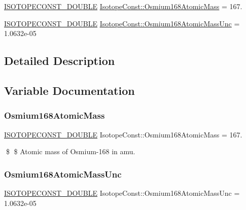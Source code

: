 \begin{DoxyCompactItemize}
\item 
\mbox{\hyperlink{group___isotope_const-_macros_ga8f45a7272ce02c0b4c65c44636ed719a}{I\+S\+O\+T\+O\+P\+E\+C\+O\+N\+S\+T\+\_\+\+D\+O\+U\+B\+LE}} \mbox{\hyperlink{group___isotope_const-_osmium-_os168_ga7a6e92fca4870475523eef9ddea7dcc1}{Isotope\+Const\+::\+Osmium168\+Atomic\+Mass}} = 167.
\item 
\mbox{\hyperlink{group___isotope_const-_macros_ga8f45a7272ce02c0b4c65c44636ed719a}{I\+S\+O\+T\+O\+P\+E\+C\+O\+N\+S\+T\+\_\+\+D\+O\+U\+B\+LE}} \mbox{\hyperlink{group___isotope_const-_osmium-_os168_ga8a1a5e42d66a2e49a0239e76a800618e}{Isotope\+Const\+::\+Osmium168\+Atomic\+Mass\+Unc}} = 1.\+0632e-\/05
\end{DoxyCompactItemize}


\subsection{Detailed Description}


\subsection{Variable Documentation}
\mbox{\label{group___isotope_const-_osmium-_os168_ga7a6e92fca4870475523eef9ddea7dcc1}} 
\subsubsection{\texorpdfstring{Osmium168\+Atomic\+Mass}{Osmium168AtomicMass}}
{\footnotesize\ttfamily \mbox{\hyperlink{group___isotope_const-_macros_ga8f45a7272ce02c0b4c65c44636ed719a}{I\+S\+O\+T\+O\+P\+E\+C\+O\+N\+S\+T\+\_\+\+D\+O\+U\+B\+LE}} Isotope\+Const\+::\+Osmium168\+Atomic\+Mass = 167.}

\$ \$ Atomic mass of Osmium-\/168 in amu. \mbox{\label{group___isotope_const-_osmium-_os168_ga8a1a5e42d66a2e49a0239e76a800618e}} 
\subsubsection{\texorpdfstring{Osmium168\+Atomic\+Mass\+Unc}{Osmium168AtomicMassUnc}}
{\footnotesize\ttfamily \mbox{\hyperlink{group___isotope_const-_macros_ga8f45a7272ce02c0b4c65c44636ed719a}{I\+S\+O\+T\+O\+P\+E\+C\+O\+N\+S\+T\+\_\+\+D\+O\+U\+B\+LE}} Isotope\+Const\+::\+Osmium168\+Atomic\+Mass\+Unc = 1.\+0632e-\/05}

